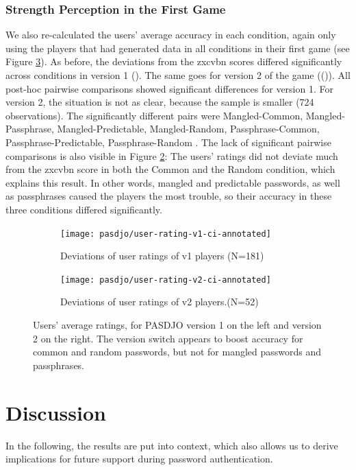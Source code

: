 \subsubsection{Strength Perception in the First Game}
We also re-calculated the users' average accuracy in each condition, again only using the players that had generated data in all conditions in their first game (see Figure \ref{fig:pasdjo:v1-v2-deviations}). As before, the deviations from the zxcvbn scores differed significantly across conditions in version 1 (). The same goes for version 2 of the game (()). All post-hoc pairwise comparisons showed significant differences  for version 1. For version 2, the situation is not as clear, because the sample is smaller (724 observations). The significantly different pairs were Mangled-Common, Mangled-Passphrase, Mangled-Predictable, Mangled-Random, Passphrase-Common, Passphrase-Predictable, Passphrase-Random . The lack of significant pairwise comparisons is also visible in Figure \ref{fig:pasdjo:v2-performance}: The users' ratings did not deviate much from the zxcvbn score in both the Common and the Random condition, which explains this result. In other words, mangled and predictable passwords, as well as passphrases caused the players the most trouble, so their accuracy in these three conditions differed significantly. 
\begin{figure}[htbp]
	\begin{subfigure}[t]{0.49\linewidth}
		\texttt{[image: pasdjo/user-rating-v1-ci-annotated]}
		\caption{\label{fig:pasdjo:1y-performance}Deviations of user ratings of v1 players (N=181)}
	\end{subfigure}
	\begin{subfigure}[t]{0.49\linewidth}
		\texttt{[image: pasdjo/user-rating-v2-ci-annotated]}
		\caption{\label{fig:pasdjo:v2-performance}Deviations of user ratings of v2 players.(N=52)}
	\end{subfigure}
	\caption{\label{fig:pasdjo:v1-v2-deviations} Users' average ratings, for PASDJO version 1 on the left and version 2 on the right. The version switch appears to boost accuracy for common and random passwords, but not for mangled passwords and passphrases.}
\end{figure}




\section{Discussion}
In the following, the results are put into context, which also allows us to derive implications for future support during password authentication. 
